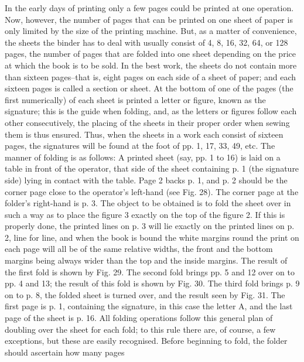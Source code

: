 \documentclass[twoside]{book}
\begin{document}
In the early days of printing only a few pages
could be printed at one operation. Now, however,
the number of pages that can be printed on one
sheet of paper is only limited by the size of the
printing machine. But, as a matter of convenience,
the sheets the binder has to deal with usually consist
of 4, 8, 16, 32, 64, or 128 pages, the number of
pages that are folded into one sheet depending on
the price at which the book is to be sold. In the
best work, the sheets do not contain more than
sixteen pages--that is, eight pages on each side
of a sheet of paper; and each sixteen pages is
called a section or sheet. At the bottom of one of
the pages (the first numerically) of each sheet is
printed a letter or figure, known as the signature;
this is the guide when folding, and, as the letters
or figures follow each other consecutively, the
placing of the sheets in their proper order when sewing
them is thus ensured. Thus, when the sheets in a
work each consist of sixteen pages, the signatures
will be found at the foot of pp. 1, 17, 33, 49, etc.
The manner of folding is as follows: A printed sheet
(say, pp. 1 to 16) is laid on a table in front of the
operator, that side of the sheet containing p. 1 (the
signature side) lying in contact with the table.
Page 2 backs p. 1, and p. 2 should be the corner
page close to the operator's left-hand (see Fig. 28).
The corner page at the folder's right-hand is p. 3.
The object to be obtained is to fold the sheet over
in such a way as to place the figure 3 exactly on the
top of the figure 2. If this is properly done, the
printed lines on p. 3 will lie exactly on the printed
lines on p. 2, line for line, and when the book is
bound the white margins round the print on each
page will all be of the same relative widths, the
front and the bottom margins being always wider
\pagebreak
than the top and the inside margins. The result
of the first fold is shown by Fig. 29. The second
fold brings pp. 5 and 12 over on to pp. 4 and 13;
the result of this fold is shown by Fig. 30. The
third fold brings p. 9 on to p. 8, the folded sheet is
turned over, and the result seen by Fig. 31. The
first page is p. 1, containing the signature, in this
case the letter A, and the last page of the sheet is
p. 16. All folding operations follow this general
plan of doubling over the sheet for each fold; to
this rule there are, of course, a few exceptions, but
these are easily recognised. Before beginning to
fold, the folder should ascertain how many pages
\end{document}
